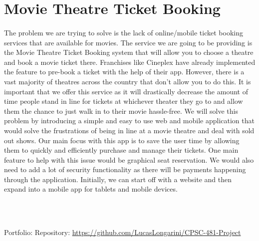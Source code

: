\documentclass{article}
\begin{document}
\section{Movie Theatre Ticket Booking}
\paragraph{}
The problem we are trying to solve is the lack of online/mobile ticket booking services that are available for movies.
The service we are going to be providing is the Movie Theatre Ticket Booking system that will allow you to choose a theatre and book a movie ticket there.
Franchises like Cineplex have already implemented the feature to pre-book a ticket with the help of their app. However, there is a vast majority of theatres across the country that don’t allow you to do this.
It is important that we offer this service as it will drastically decrease the amount of time people stand in line for tickets at whichever theater they go to and allow them the chance to just walk in to their movie hassle-free.
We will solve this problem by introducing a simple and easy to use web and mobile application that would solve the frustrations of being in line at a movie theatre and deal with sold out shows.
Our main focus with this app is to save the user time by allowing them to quickly and efficiently purchase and manage their tickets. One main feature to help with this issue would be graphical seat reservation.
We would also need to add a lot of security functionality as there will be payments happening through the application. Initially,  we can start off with a website and then expand into a mobile app for tablets and mobile devices.

\\~\\

\begin{flushleft}  
Portfolio:
\newline
Repository: \url{https://github.com/LucasLongarini/CPSC-481-Project}
\end{flushleft}  
\end{document}
